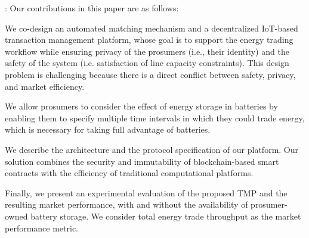 : Our contributions in this paper are as follows: %
\begin{compactitem}
\item  We co-design an automated matching mechanism and a decentralized IoT-based transaction management platform, whose goal is to support the energy trading workflow while ensuring privacy of the prosumers (i.e., their identity) and the safety of the system (i.e. satisfaction of line capacity constraints). 
This design problem is challenging because there is a direct conflict between safety, privacy, and market efficiency.


\item We allow prosumers to consider the effect of energy storage in batteries by enabling them to specify multiple time intervals in which they could trade energy, which is necessary for taking full advantage of batteries.
\item We describe the architecture and the protocol specification of our platform.
Our solution combines the security and immutability of blockchain-based smart contracts with the efficiency of traditional computational platforms.
\item 
Finally, we present an experimental evaluation of the proposed TMP and the resulting market performance, with and without the availability of prosumer-owned battery storage. We consider total energy trade throughput as the market performance metric.
\end{compactitem}

